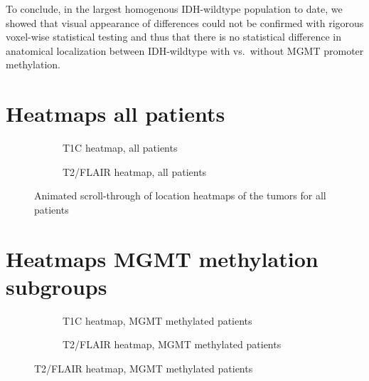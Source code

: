 To conclude, in the largest homogenous \gls{IDH}-wildtype  population to date, we showed that visual appearance of differences could not be confirmed with rigorous voxel-wise statistical testing and thus that there is no statistical difference in anatomical localization between \gls{IDH}-wildtype  with vs.\ without \gls{MGMT} promoter methylation.

\newpage
\begin{subappendices}

    \section{Heatmaps all patients}
    \begin{figure}[H]
        \centering
        \begin{subfigure}[t]{0.4\textwidth}
            \centering
            \caption{\acrshort{T1C} heatmap, all patients}\label{fig:HGG_loc_T1_heatmap_all}
        \end{subfigure}
        \hfill
        \begin{subfigure}[t]{0.4\textwidth}
            \centering
            \caption{\acrshort{T2}/\acrshort{FLAIR} heatmap, all patients}\label{fig:HGG_loc_T2_heatmap_all}
        \end{subfigure}
        \caption{Animated scroll-through of location heatmaps of the \glspl{tumor} for all patients}\label{fig:HGG_local_heatmaps_full_all}
    \end{figure}

    \newpage

    \section{Heatmaps MGMT methylation subgroups}
    \begin{figure}[H]
        \centering
        \begin{subfigure}[t]{0.4\textwidth}
            \centering
            \caption{\acrshort{T1C} heatmap, \gls{MGMT} methylated patients}\label{fig:HGG_loc_T1_heatmap_methylated}
        \end{subfigure}
        \hfill
        \begin{subfigure}[t]{0.4\textwidth}
            \centering
            \caption{\acrshort{T2}/\acrshort{FLAIR} heatmap, \gls{MGMT} methylated patients}\label{fig:HGG_loc_T2_heatmap_methylated}
        \end{subfigure}


\end{figure}
\end{subappendices}

